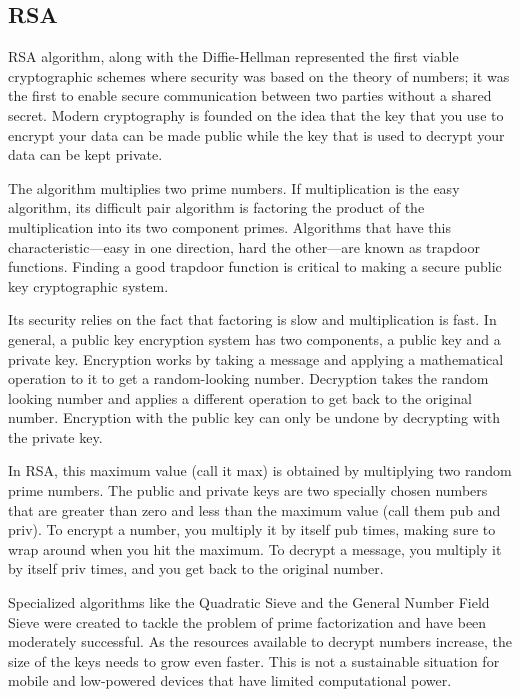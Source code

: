 \subsection{RSA}
RSA algorithm, along with the Diffie-Hellman represented the first viable cryptographic schemes where security was based on the theory of numbers; it was the first to enable secure communication between two parties without a shared secret.
Modern cryptography is founded on the idea that the key that you use to encrypt your data can be made public while the key that is used to decrypt your data can be kept private.

The algorithm multiplies two prime numbers. If multiplication is the easy algorithm, its difficult pair algorithm is factoring the product of the multiplication into its two component primes. Algorithms that have this characteristic—easy in one direction, hard the other—are known as trapdoor functions. Finding a good trapdoor function is critical to making a secure public key cryptographic system.

Its security relies on the fact that factoring is slow and multiplication is fast. In general, a public key encryption system has two components, a public key and a private key. Encryption works by taking a message and applying a mathematical operation to it to get a random-looking number. Decryption takes the random looking number and applies a different operation to get back to the original number. Encryption with the public key can only be undone by decrypting with the private key.

In RSA, this maximum value (call it max) is obtained by multiplying two random prime numbers. The public and private keys are two specially chosen numbers that are greater than zero and less than the maximum value (call them pub and priv). To encrypt a number, you multiply it by itself pub times, making sure to wrap around when you hit the maximum. To decrypt a message, you multiply it by itself priv times, and you get back to the original number.

Specialized algorithms like the Quadratic Sieve and the General Number Field Sieve were created to tackle the problem of prime factorization and have been moderately successful. As the resources available to decrypt numbers increase, the size of the keys needs to grow even faster. This is not a sustainable situation for mobile and low-powered devices that have limited computational power.

